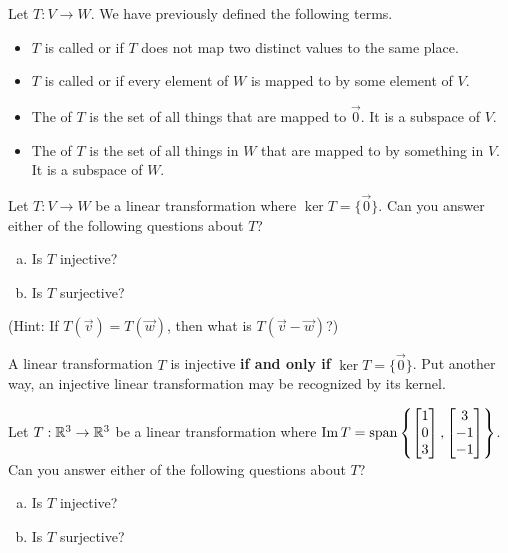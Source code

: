 \begin{applicationActivities}

\begin{observation}
Let $T: V \rightarrow W$.  We have previously defined the following
terms.
\begin{itemize}
\item  $T$ is called  or  if $T$ does not map two distinct values to the same place.
\item $T$ is called  or  if every element of $W$ is mapped to by some element of $V$.
\item The  of $T$ is the set of all things that are mapped to $\vec{0}$.  It is a subspace of $V$.
\item The  of $T$ is the set of all things in $W$ that are mapped to by something in $V$.  It is a subspace of $W$.
\end{itemize}
\end{observation}

\begin{activity}{5}
Let $T: V \rightarrow W$ be a linear transformation where
$\ker T = \{ \vec{0} \}$. Can you answer either of the following questions
about \(T\)?
\begin{enumerate}[(a)]
\item Is $T$ injective?
\item Is $T$ surjective?
\end{enumerate}
(Hint: If $T(\vec{v})=T(\vec{w})$, then what is $T(\vec{v}-\vec{w})$?)
\end{activity}

\begin{fact}
A linear transformation $T$ is injective \textbf{if and only if} $\ker T = \{\vec{0}\}$. Put another way, an injective linear transformation may be
recognized by its  kernel.
\end{fact}

\begin{activity}{5}
Let $T: \mathbb{R}^3 \rightarrow \mathbb{R}^3$ be a linear transformation where
$\operatorname{Im} T = \operatorname{span} \left\{ \begin{bmatrix} 1 \\ 0 \\ 3 \end{bmatrix}, \begin{bmatrix} 3 \\ -1 \\ -1 \end{bmatrix} \right\}$.
Can you answer either of the following questions about \(T\)?
\begin{enumerate}[(a)]
\item Is $T$ injective?
\item Is $T$ surjective?
\end{enumerate}
\end{activity}


\end{applicationActivities}
